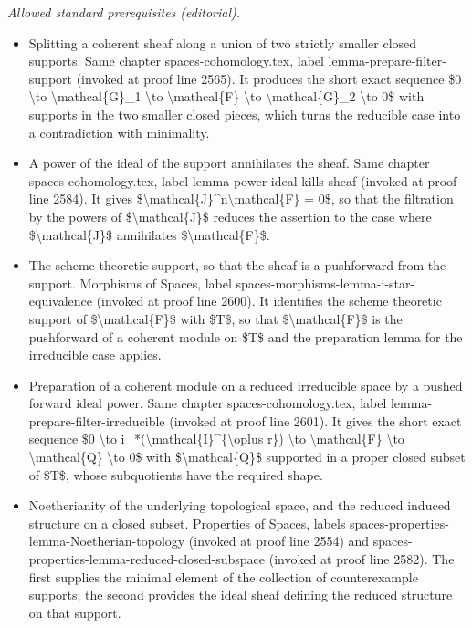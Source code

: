 \documentclass[10pt,a4paper]{amsart}
\theoremstyle{plain}
\theoremstyle{definition}
\theoremstyle{remark}
\numberwithin{equation}{subsection}
\begin{document}
\noindent\textit{Allowed standard prerequisites (editorial).}\begin{itemize}
\item Splitting a coherent sheaf along a union of two strictly smaller closed supports. Same chapter spaces-cohomology.tex, label lemma-prepare-filter-support (invoked at proof line 2565). It produces the short exact sequence \$0 \textbackslash{}to \textbackslash{}mathcal\{G\}\_1 \textbackslash{}to \textbackslash{}mathcal\{F\} \textbackslash{}to \textbackslash{}mathcal\{G\}\_2 \textbackslash{}to 0\$ with supports in the two smaller closed pieces, which turns the reducible case into a contradiction with minimality.
\item A power of the ideal of the support annihilates the sheaf. Same chapter spaces-cohomology.tex, label lemma-power-ideal-kills-sheaf (invoked at proof line 2584). It gives \$\textbackslash{}mathcal\{J\}\textasciicircum{}n\textbackslash{}mathcal\{F\} = 0\$, so that the filtration by the powers of \$\textbackslash{}mathcal\{J\}\$ reduces the assertion to the case where \$\textbackslash{}mathcal\{J\}\$ annihilates \$\textbackslash{}mathcal\{F\}\$.
\item The scheme theoretic support, so that the sheaf is a pushforward from the support. Morphisms of Spaces, label spaces-morphisms-lemma-i-star-equivalence (invoked at proof line 2600). It identifies the scheme theoretic support of \$\textbackslash{}mathcal\{F\}\$ with \$T\$, so that \$\textbackslash{}mathcal\{F\}\$ is the pushforward of a coherent module on \$T\$ and the preparation lemma for the irreducible case applies.
\item Preparation of a coherent module on a reduced irreducible space by a pushed forward ideal power. Same chapter spaces-cohomology.tex, label lemma-prepare-filter-irreducible (invoked at proof line 2601). It gives the short exact sequence \$0 \textbackslash{}to i\_*(\textbackslash{}mathcal\{I\}\textasciicircum{}\{\textbackslash{}oplus r\}) \textbackslash{}to \textbackslash{}mathcal\{F\} \textbackslash{}to \textbackslash{}mathcal\{Q\} \textbackslash{}to 0\$ with \$\textbackslash{}mathcal\{Q\}\$ supported in a proper closed subset of \$T\$, whose subquotients have the required shape.
\item Noetherianity of the underlying topological space, and the reduced induced structure on a closed subset. Properties of Spaces, labels spaces-properties-lemma-Noetherian-topology (invoked at proof line 2554) and spaces-properties-lemma-reduced-closed-subspace (invoked at proof line 2582). The first supplies the minimal element of the collection of counterexample supports; the second provides the ideal sheaf defining the reduced structure on that support.
\end{itemize}\medskip
\end{document}
